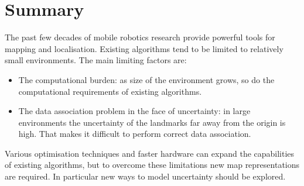 \section{Summary}

The past few decades of mobile robotics research provide powerful
tools for mapping and localisation. Existing algorithms tend to be
limited to relatively small environments. The main limiting factors
are:

\begin{itemize}
\item The computational burden: as size of the environment grows, so do
  the computational requirements of existing algorithms.

\item The data association problem in the face of uncertainty: 
   in large environments the uncertainty of the landmarks far away
  from the origin is high. That makes it difficult to perform correct
  data association.

\end{itemize}

Various optimisation techniques and faster hardware can expand the
capabilities of existing algorithms, but to overcome these limitations
new map representations are required. In particular new ways to model
uncertainty should be explored.






\nocite{tim_bailey,
bosse03atlas,
fergusson2003,
thrun00,
dissanayake01,
SOG-Slam01,
guivant02:_simul,
guivant02:_solvin,
thrun02:_robot_mappin,
 zunino01:_simul,
 JensfeltKristensen01,
 JensfeltWijkAustin00a,
 JensfeltAustinWijk00b,
 anguelov02,
 hahnel02:_map,
 burgard99:_exper,
 schulz01:_track_multip_movin_objec_mobil_robot,
 castellanos99:_spmap,
 castellanos01:_multis,
 dudek00:_robus_place_recog_local_appear_method,
 konolige99:_increm_mappin_large_cyclic_envir,
 lu97:_global,
 gutmann96:_amos,
 williams:icra2002,
 williams:acra2001,
 Zimmer96,
 slam_kuiper91,
 slam_kuipers88,
 Thrun00j,
 Fox99,
 Cox91,
 Borenstein96,
 kk2002,
 sidenbladh00stochastic,
 Cox94,
 Thrun02h,
 Bennewitz02a,
 Liu01a,
 Dellaert00c,
 nieto2003, 
 konolige99,
 doucetraoblackwellised,
 guivant04,
 newman03,
 vandermerwe00_tr,
 vandermerwe2000,
 wan01unscented,
 unscented,
 Margaret_hybrid_maps,
 kuipers1978,
 KuipersLevitt88,
 Kuipers00,
 Buzan04,
 uhlmann97nondivergent,
 julier97new,
 julier96general,
 julier99scaled,
 doucet98sequential,
 DA_Lazy,
 Kuipers2004,
 kk2004}




